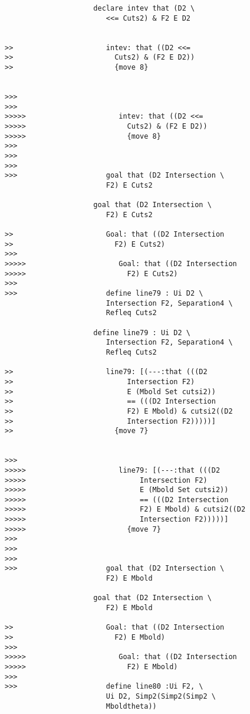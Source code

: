 \documentclass[12pt]{article}
\begin{document}
\begin{verbatim}
                     declare intev that (D2 \
                        <<= Cuts2) & F2 E D2


>>                      intev: that ((D2 <<=
>>                        Cuts2) & (F2 E D2))
>>                        {move 8}


>>>
>>>
>>>>>                      intev: that ((D2 <<=
>>>>>                        Cuts2) & (F2 E D2))
>>>>>                        {move 8}
>>>
>>>
>>>
>>>                     goal that (D2 Intersection \
                        F2) E Cuts2

                     goal that (D2 Intersection \
                        F2) E Cuts2

>>                      Goal: that ((D2 Intersection
>>                        F2) E Cuts2)
>>>
>>>>>                      Goal: that ((D2 Intersection
>>>>>                        F2) E Cuts2)
>>>
>>>                     define line79 : Ui D2 \
                        Intersection F2, Separation4 \
                        Refleq Cuts2

                     define line79 : Ui D2 \
                        Intersection F2, Separation4 \
                        Refleq Cuts2

>>                      line79: [(---:that (((D2
>>                           Intersection F2)
>>                           E (Mbold Set cutsi2))
>>                           == (((D2 Intersection
>>                           F2) E Mbold) & cutsi2((D2
>>                           Intersection F2)))))]
>>                        {move 7}


>>>
>>>>>                      line79: [(---:that (((D2
>>>>>                           Intersection F2)
>>>>>                           E (Mbold Set cutsi2))
>>>>>                           == (((D2 Intersection
>>>>>                           F2) E Mbold) & cutsi2((D2
>>>>>                           Intersection F2)))))]
>>>>>                        {move 7}
>>>
>>>
>>>
>>>                     goal that (D2 Intersection \
                        F2) E Mbold

                     goal that (D2 Intersection \
                        F2) E Mbold

>>                      Goal: that ((D2 Intersection
>>                        F2) E Mbold)
>>>
>>>>>                      Goal: that ((D2 Intersection
>>>>>                        F2) E Mbold)
>>>
>>>                     define line80 :Ui F2, \
                        Ui D2, Simp2(Simp2(Simp2 \
                        Mboldtheta))


\end{verbatim}
\end{document}
